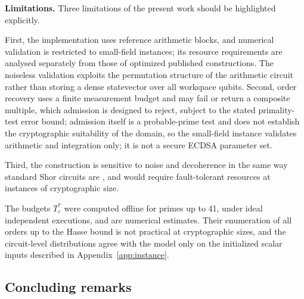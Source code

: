 \textbf{Limitations.} Three limitations of the present work should be highlighted explicitly. \begin{revision}First, the implementation uses reference arithmetic blocks, and numerical validation is restricted to small-field instances; its resource requirements are analysed separately from those of optimized published constructions. The noiseless validation exploits the permutation structure of the arithmetic circuit rather than storing a dense statevector over all workspace qubits. Second, order recovery uses a finite measurement budget and may fail or return a composite multiple, which admission is designed to reject, subject to the stated primality-test error bound; admission itself is a probable-prime test and does not establish the cryptographic suitability of the domain, so the small-field instance validates arithmetic and integration only; it is not a secure ECDSA parameter set.\end{revision} Third, the construction is sensitive to noise and decoherence in the same way standard Shor circuits are \cite{Preskill2018,Devitt2013}, and would require fault-tolerant resources at instances of cryptographic size.
\begin{revision}

The budgets $T_\varepsilon^*$ were computed offline for primes up to 41, under ideal independent executions, and are numerical estimates. Their enumeration of all orders up to the Hasse bound is not practical at cryptographic sizes, and the circuit-level distributions agree with the model only on the initialized scalar inputs described in Appendix~\ref{app:instance}.
\end{revision}


\subsection{Concluding remarks}\label{sec:conclusion}

